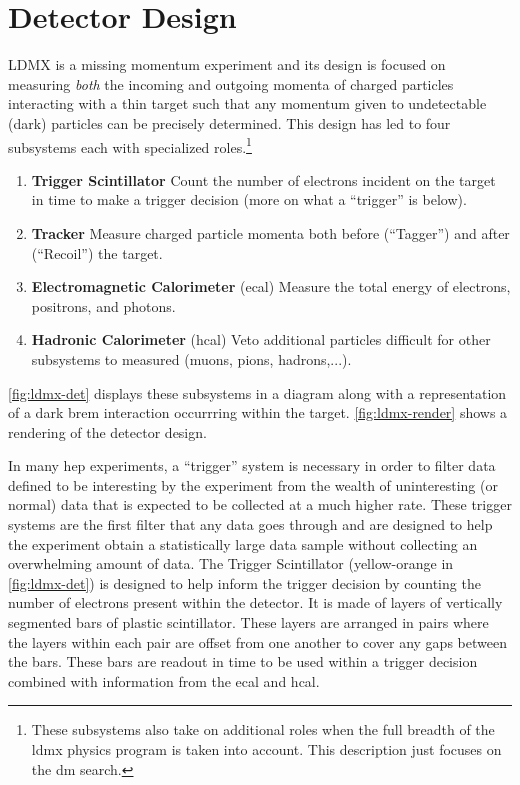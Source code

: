 \section{Detector Design}
LDMX is a missing momentum experiment and its design is focused on measuring \emph{both} the
incoming and outgoing momenta of charged particles interacting with a thin target such that
any momentum given to undetectable (dark) particles can be precisely determined. This design has
led to four subsystems each with specialized roles.\footnote{These subsystems also take on
additional roles when the full breadth of the \ac{ldmx} physics program is taken into account.
This description just focuses on the \ac{dm} search.}
\begin{enumerate}
  \item \textbf{Trigger Scintillator} Count the number of electrons incident on the target in time to make a trigger decision (more on what a ``trigger'' is below).
  \item \textbf{Tracker} Measure charged particle momenta both before (``Tagger'') and after (``Recoil'') the target.
  \item \textbf{Electromagnetic Calorimeter} (\ac{ecal}) Measure the total energy of electrons, positrons, and photons.
  \item \textbf{Hadronic Calorimeter} (\acs{hcal}) Veto additional particles difficult for other subsystems to measured (muons, pions, hadrons,...).
\end{enumerate}
\cref{fig:ldmx-det} displays these subsystems in a diagram along with a representation of
a dark brem interaction occurrring within the target. \cref{fig:ldmx-render} shows a rendering
of the detector design.

In many \ac{hep} experiments, a ``trigger'' system is necessary in order to filter data defined to
be interesting by the experiment from the wealth of uninteresting (or normal) data that is expected
to be collected at a much higher rate. These trigger systems are the first filter that any data goes
through and are designed to help the experiment obtain a statistically large data sample without
collecting an overwhelming amount of data.
The Trigger Scintillator (yellow-orange in \cref{fig:ldmx-det}) is designed to help inform the trigger
decision by counting the number of electrons present within the detector. It is made of layers of vertically
segmented bars of plastic scintillator. These layers are arranged in pairs where the layers within
each pair are offset from one another to cover any gaps between the bars. These bars are readout in
time to be used within a trigger decision combined with information from the \ac{ecal} and \ac{hcal}.

